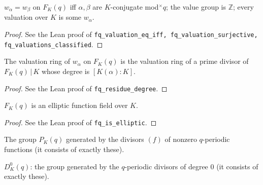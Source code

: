 \begin{theorem}
\label{thm:fq-valuations}
\leanok
$w_\alpha=w_\beta$ on $F_K(q)$ iff $\alpha,\beta$ are $K$-conjugate mod$^\times q$; the value group is $\mathbb Z$; every valuation over $K$ is some $w_\alpha$.
\end{theorem}
\begin{proof}
\leanok
See the Lean proof of \texttt{fq\_valuation\_eq\_iff, fq\_valuation\_surjective, fq\_valuations\_classified}.
\end{proof}

\begin{theorem}
\label{thm:fq-residue}
\leanok
The valuation ring of $w_\alpha$ on $F_K(q)$ is the valuation ring of a prime divisor of $F_K(q)\,|\,K$ whose degree is $[K(\alpha):K]$.
\end{theorem}
\begin{proof}
\leanok
See the Lean proof of \texttt{fq\_residue\_degree}.
\end{proof}

\begin{theorem}
\label{thm:fq-elliptic}
\leanok
$F_K(q)$ is an elliptic function field over $K$.
\end{theorem}
\begin{proof}
\leanok
See the Lean proof of \texttt{fq\_is\_elliptic}.
\end{proof}

\begin{definition}
\label{def:principal-divisors}
\leanok
The group $P_K(q)$ generated by the divisors $(f)$ of nonzero $q$-periodic functions (it consists of exactly these).
\end{definition}

\begin{definition}
\label{def:D0q}
\leanok
$D^0_K(q)$: the group generated by the $q$-periodic divisors of degree $0$ (it consists of exactly these).
\end{definition}

